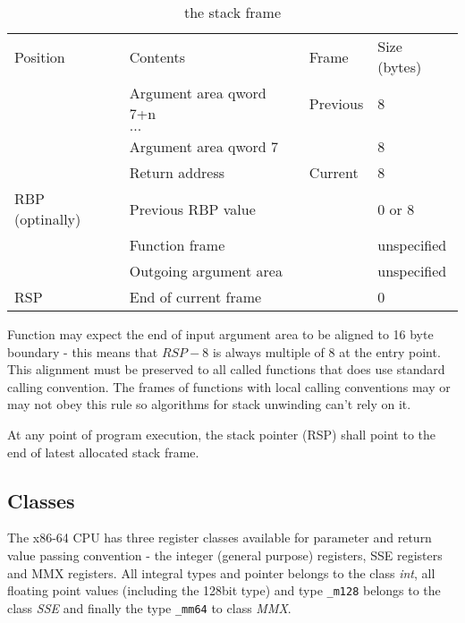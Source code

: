 \begin{table}
\caption{the stack frame}
\label{tab-stack-frame}
\begin{center}
\begin{tabular}{l|l|l|l}
\hline\noalign{\smallskip}
Position & Contents & Frame & Size (bytes) \\
\noalign{\smallskip}\hline\noalign{\smallskip}
& Argument area qword 7+n & Previous & 8 \\
& $...$ & & \\
& Argument area qword 7 & & 8 \\
\hline
& Return address & Current & 8\\
RBP (optinally) & Previous RBP value & & 0 or 8\\
& Function frame & & unspecified\\
& Outgoing argument area & & unspecified\\
RSP & End of current frame & & 0\\
\hline
\end{tabular}
\end{center}
\end{table}

Function may expect the end of input argument area to be aligned to 16 byte
boundary - this means that $RSP - 8$ is always multiple of 8 at the entry
point. This alignment must be preserved to all called functions that does use
standard calling convention. The frames of functions with local calling
conventions may or may not obey this rule so algorithms for stack unwinding
can't rely on it.

At any point of program execution, the stack pointer (RSP) shall point to
the end of latest allocated stack frame.

\subsection{Classes}
The x86-64 CPU has three register classes available for parameter and return
value passing convention - the integer (general purpose) registers, SSE
registers and MMX registers.  All integral types and pointer belongs to the
class \emph{int}, all floating point values (including the 128bit type) and
type \verb|_m128| belongs to the class \emph{SSE} and finally the type
\verb|_mm64| to class \emph{MMX}.

